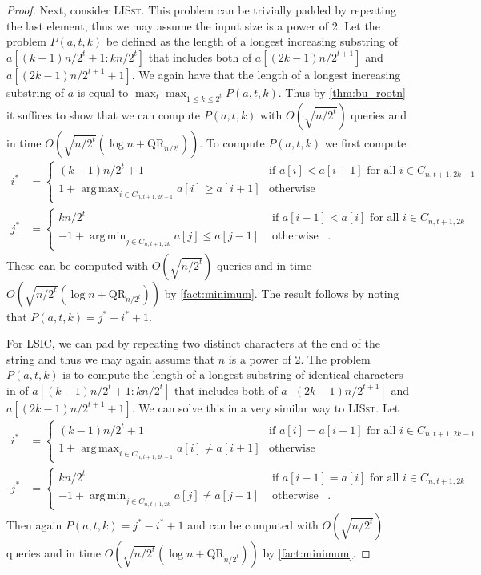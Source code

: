 \documentclass[12pt]{article}
\newcommand{\qr}{\mathrm{QR}}
\DeclareMathOperator*{\argmax}{arg\,max}
\DeclareMathOperator*{\argmin}{arg\,min}
\newcommand{\upto}{\mathbin{:}}
\newcommand{\LSIC}{\textsc{LSIC}}
\newcommand{\LISst}{\textsc{LISst}}
\theoremstyle{definition}
\begin{document}
\begin{proof}
Next, consider \LISst.  This problem can be trivially padded by repeating the last element, thus we may assume the input size is a power of 2.  
Let the problem $P(a, t, k)$ be defined as the length of a longest increasing substring of $a[(k-1)n/2^t + 1 \upto kn/2^t]$ that includes both of $a[(2k-1)n/2^{t+1}]$ and $a[(2k-1)n/2^{t+1}+1]$. 
We again have that the length of a longest increasing substring of $a$ is equal to $\max_t \max_{1 \le k \le 2^t} P(a, t, k)$.
Thus by \cref{thm:bu_rootn} it suffices to show that we can compute $P(a, t, k)$ with $O(\sqrt{n/2^t})$ queries and in time $O(\sqrt{n/2^t} (\log n + \qr_{n/2^t}))$.  
To compute $P(a, t, k)$ we first compute
\begin{align*}
i^* &= 
\begin{cases}
(k-1)n/2^t + 1 & \text{ if } a[i] < a[i+1] \text{ for all } i \in C_{n, t+1, 2k-1} \\
1 +\argmax_{i \in C_{n, t+1, 2k-1}} a[i] \ge a[i+1] & \text{ otherwise }
\end{cases} \\
j^* &= 
\begin{cases} 
kn/2^t & \text{ if } a[i-1] < a[i] \text{ for all } i \in C_{n, t+1, 2k} \\
-1 + \argmin_{j \in C_{n, t+1, 2k}} a[j] \le a[j-1] & \text{ otherwise } \enspace.
\end{cases} 
\end{align*}
These can be computed with $O(\sqrt{n/2^t})$ queries and in time $O(\sqrt{n/2^t} (\log n + \qr_{n/2^t}))$ by \cref{fact:minimum}.  The result follows by noting that $P(a, t, k) = j^* - i^* + 1$.

For \LSIC, we can pad by repeating two distinct characters at the end of the string and thus we may again assume that $n$ is a power of 2.  
The problem $P(a, t, k)$ is to compute the length of a longest substring of identical characters in of $a[(k-1)n/2^t + 1 \upto kn/2^t]$ that includes both of $a[(2k-1)n/2^{t+1}]$ and $a[(2k-1)n/2^{t+1}+1]$.
We can solve this in a very similar way to \LISst. Let
\begin{align*}
i^* &= 
\begin{cases}
(k-1)n/2^t + 1 & \text{ if } a[i] = a[i+1] \text{ for all } i \in C_{n, t+1, 2k-1} \\
1 +\argmax_{i \in C_{n, t+1, 2k-1}} a[i] \ne a[i+1] & \text{ otherwise }
\end{cases} \\
j^* &= 
\begin{cases} 
kn/2^t & \text{ if } a[i-1] = a[i] \text{ for all } i \in C_{n, t+1, 2k} \\
-1 + \argmin_{j \in C_{n, t+1, 2k}} a[j] \ne a[j-1] & \text{ otherwise } \enspace.
\end{cases} 
\end{align*}
Then again $P(a, t, k) = j^* - i^* + 1$ and can be computed with $O(\sqrt{n/2^t})$ queries and in time $O(\sqrt{n/2^t} (\log n + \qr_{n/2^t}))$ by \cref{fact:minimum}.  


\end{proof}
\end{document}
